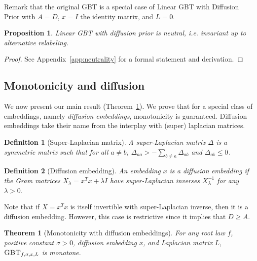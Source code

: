 \documentclass{article}
\newtheorem{definition}{Definition}
\newtheorem{proposition}{Proposition}
\newtheorem{theorem}{Theorem}
\newcommand{\GBT}{\textsc{GBT}}
\begin{document}
Remark that the original GBT is a special case of Linear GBT with Diffusion Prior with $A=D$, $x = I$ the identity matrix, and $L = 0$.


\begin{proposition}
\label{prop:neutrality}
    Linear GBT with diffusion prior is \emph{neutral},
    i.e. invariant up to alternative relabeling.
\end{proposition}

\begin{proof}
    See Appendix~\ref{app:neutrality} for a formal statement and derivation.
\end{proof}


\subsection{Monotonicity and diffusion}
\label{sec:monotonicity-diffusion}

We now present our main result (Theorem~\ref{th:diffusion-embedding-is-good}).
We prove that for a special class of embeddings, namely \emph{diffusion embeddings},
monotonicity is guaranteed.
Diffusion embeddings take their name from 
the interplay with (super) laplacian matrices.




\begin{definition}[Super-Laplacian matrix]
   A super-Laplacian matrix
   $\Delta$ is a symmetric matrix 
   such that for all $a \ne b$,
       $\Delta_{aa} > - \sum_{b \ne a} \Delta_{ab}$
       and $\Delta_{ab} \le 0$.
\end{definition}




\begin{definition}[Diffusion embedding]
    An embedding $x$ is a diffusion embedding
    if the Gram matrices $X_\lambda = x^Tx + \lambda I$
    have super-Laplacian inverses $X_\lambda^{-1}$ for any $\lambda > 0$.
\end{definition}

Note that if $X = x^T x$ is itself invertible with super-Laplacian inverse, then it is a diffusion embedding. However, this case is restrictive since it implies that $D\geq A$.






\begin{theorem}[Monotonicity with diffusion embeddings]
    \label{th:diffusion-embedding-is-good}
    For any  root law $f$, 
    positive constant $\sigma > 0$, diffusion embedding $x$,
    and Laplacian matrix $L$,
    $\GBT_{f,\sigma,x,L}$ is monotone.
\end{theorem}
\end{document}
